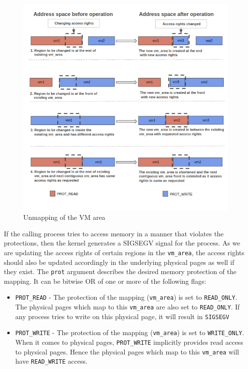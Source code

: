 \documentclass[12pt]{article}
\begin{document}
\begin{figure}[H]
    \centering
    \includegraphics[scale=0.6]{mm6.png}
    \caption{Unmapping of the VM area}
    \label{fig:my_label}
\end{figure}

If the calling process tries to access memory in a manner that violates the protections, then the kernel generates a SIGSEGV signal for the process. As we are updating the access rights of certain regions in the {\tt vm\_area}, the access rights should also be updated accordingly in the underlying physical pages as well if they exist.
\newpage
The {\tt prot} argument describes the desired memory protection of the mapping.  It can be bitwise OR of one or more of the following flags:

    
    \begin{itemize}
        \item {{\tt PROT\_READ}  -  The protection of the mapping ({\tt vm\_area}) is set to {\tt READ\_ONLY}. The physical pages which map to this {\tt vm\_area} are also set to {\tt READ\_ONLY}. If any process tries to write on this physical page, it will result in {\tt SIGSEGV}}
        
        \item { {\tt PROT\_WRITE} - The protection of the mapping ({\tt vm\_area}) is set to {\tt WRITE\_ONLY}. When it comes to physical pages, {\tt PROT\_WRITE} implicitly provides read access to physical pages. Hence the physical pages which map to this {\tt vm\_area} will have {\tt READ\_WRITE} access.}
        
    \end{itemize}
\end{document}
